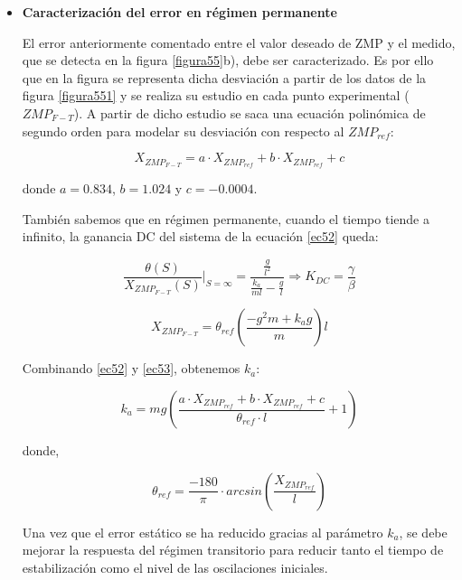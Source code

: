 \begin{itemize}

\item \textbf{Caracterización del error en régimen permanente}

El error anteriormente comentado entre el valor deseado de ZMP y el medido, que se detecta en la figura \ref{figura55}b), debe ser caracterizado. Es por ello que en la figura %
se representa dicha desviación a partir de los datos de la figura \ref{figura551} y se realiza su estudio en cada punto experimental ($ZMP_{F-T}$). A partir de dicho estudio se saca una ecuación polinómica de segundo orden para modelar su desviación con respecto al $ZMP_{ref}$:

\begin{equation}
X_{ZMP_{F-T}} = a \cdot X_{ZMP_{ref}} + b \cdot X_{ZMP_{ref}} + c
\label{ec53}
\end{equation}

donde $a=0.834$, $b=1.024$ y $c=-0.0004$.



También sabemos que en régimen permanente, cuando el tiempo tiende a infinito, la ganancia DC del sistema de la ecuación \ref{ec52} queda:

\begin{equation}
\frac{\theta(S)}{X_{ZMP_{F-T}}(S)}|_{S=\infty}=\frac{\frac{g}{l^2}}{\frac{k_a}{ml} - \frac{g}{l}}\Rightarrow K_{DC}=\frac{\gamma}{\beta}
\label{ec54}
\end{equation}

\begin{equation}
X_{ZMP_{F-T}}=\theta_{ref}(\frac{-g^{2}m+k_{a}g}{m})l
\label{ec55}
\end{equation}

Combinando \ref{ec52} y \ref{ec53}, obtenemos $k_a$:

\begin{equation}
k_a=mg(\frac{a \cdot X_{ZMP_{ref}} + b \cdot X_{ZMP_{ref}} + c}{\theta_{ref}\cdot l}+1)
\label{ec56}
\end{equation}

donde,

\begin{equation}
\theta_{ref}=\frac{-180}{\pi}\cdot arcsin(\frac{X_{ZMP_{ref}}}{l})
\label{ec57}
\end{equation}

Una vez que el error estático se ha reducido gracias al parámetro $k_a$, se debe mejorar la respuesta del régimen transitorio para reducir tanto el tiempo de estabilización como el nivel de las oscilaciones iniciales.


\end{itemize}
